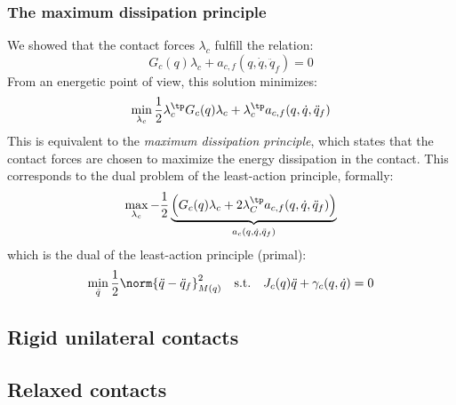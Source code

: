 \subsubsection{The maximum dissipation principle}
We showed that the contact forces $\lambda_c$ fulfill the relation:
\begin{equation*}
    G_c(q)\lambda_c + a_{c, f}(q, \dot{q}, \ddot{q}_f) = 0
\end{equation*}
From an energetic point of view, this solution minimizes:
\begin{equation*}
    \min_{\lambda_c} \frac{1}{2}\lambda_c^\tp G_c(q)\lambda_c + \lambda_c^\tp a_{c, f}(q, \dot{q}, \ddot{q}_f)
\end{equation*}
This is equivalent to the \emph{maximum dissipation principle}, which states that the contact forces are chosen to maximize the energy dissipation in the contact. This corresponds to the dual problem of the least-action principle, formally:
\begin{equation*}
    \max_{\lambda_c} -\frac{1}{2}\underbrace{
        \left(
            G_c(q)\lambda_c+2\lambda_C^\tp a_{c, f}(q, \dot{q}, \ddot{q}_f)
        \right)
    }_{a_c(q, \dot{q}, \ddot{q}_f)}
\end{equation*}
which is the dual of the least-action principle (primal):
\begin{equation*}
    \min_{\ddot{q}} \frac{1}{2}\norm{\ddot{q}-\ddot{q}_f}^2_{M(q)} \quad\text{s.t.}\quad J_c(q)\ddot{q} + \gamma_c(q, \dot{q}) = 0
\end{equation*}

\subsection{Rigid unilateral contacts}

\subsection{Relaxed contacts}